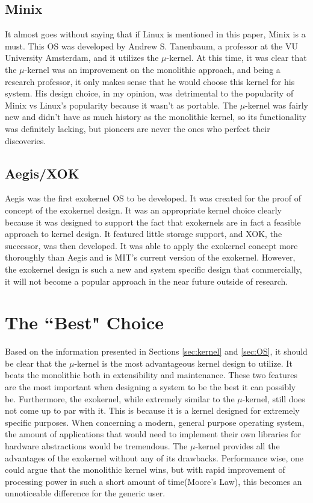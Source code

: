 \documentclass[12pt]{article}
\begin{document}
\subsection{Minix}
It almost goes without saying that if Linux is mentioned in this paper, Minix is a must. This OS was developed by Andrew S. Tanenbaum, a professor at the VU University Amsterdam, and it utilizes the $\mu$-kernel. At this time, it was clear that the $\mu$-kernel was an improvement on the monolithic approach, and being a research professor, it only makes sense that he would choose this kernel for his system. His design choice, in my opinion, was detrimental to the popularity of Minix vs Linux's popularity because it wasn't as portable. The $\mu$-kernel was fairly new and didn't have as much history as the monolithic kernel, so its functionality was definitely lacking, but pioneers are never the ones who perfect their discoveries.

\subsection{Aegis/XOK}
Aegis was the first exokernel OS to be developed. It was created for the proof of concept of the exokernel design. It was an appropriate kernel choice clearly because it was designed to support the fact that exokernels are in fact a feasible approach to kernel design. It featured little storage support, and XOK, the successor, was then developed. It was able to apply the exokernel concept more thoroughly than Aegis and is MIT's current version of the exokernel.  However, the exokernel design is such a new and system specific design that commercially, it will not become a popular approach in the near future outside of research.
\section{The ``Best" Choice}
Based on the information presented in Sections \ref{sec:kernel} and \ref{sec:OS}, it should be clear that the $\mu$-kernel is the most advantageous kernel design to utilize.
It beats the monolithic both in extensibility and maintenance. These two features are the most important when designing a system to be the best it can possibly be. Furthermore, the exokernel, while extremely similar to the $\mu$-kernel, still does not come up to par with it. This is because it is a kernel designed for extremely specific purposes. When concerning a modern, general purpose operating system, the amount of applications that would need to implement their own libraries for hardware abstractions would be tremendous. The $\mu$-kernel provides all the advantages of the exokernel without any of its drawbacks. Performance wise, one could argue that the monolithic kernel wins, but with rapid improvement of processing power in such a short amount of time(Moore's Law), this becomes an unnoticeable difference for the generic user.


\singlespacing


\end{document}
